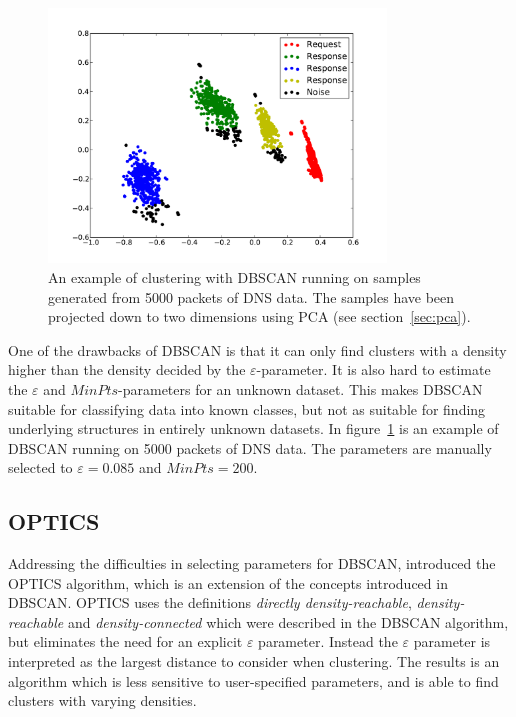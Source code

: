 \documentclass[a4paper]{report}
\begin{document}
\begin{figure}[h]
    \centering
    \includegraphics[width=0.8\textwidth]{img/dbscan_dns}
    \captionsetup{width=0.8\textwidth}
    \caption{An example of clustering with DBSCAN running on samples generated
    from 5000 packets of DNS data. The samples have been projected down to two
    dimensions using PCA (see section~\ref{sec:pca}).}
    \label{fig:dbscan}
\end{figure}

One of the drawbacks of DBSCAN is that it can only find clusters with a density
higher than the density decided by the $\varepsilon$-parameter. It is also hard
to estimate the $\varepsilon$ and $MinPts$-parameters for an unknown dataset.
This makes DBSCAN suitable for classifying data into known classes, but not as
suitable for finding underlying structures in entirely unknown datasets. In
figure~\ref{fig:dbscan} is an example of DBSCAN running on 5000 packets of DNS
data. The parameters are manually selected to $\varepsilon = 0.085$ and
$MinPts = 200$.

\subsection{OPTICS}
Addressing the difficulties in selecting parameters for DBSCAN,
\citet{ankerst99} introduced the OPTICS algorithm, which is an extension of
the concepts introduced in DBSCAN. OPTICS uses the definitions
\emph{directly density-reachable}, \emph{density-reachable} and
\emph{density-connected} which were described in the DBSCAN algorithm, but
eliminates the need for an explicit $\varepsilon$ parameter. Instead the
$\varepsilon$ parameter is interpreted as the largest distance to consider
when clustering. The results is an algorithm which is less sensitive to
user-specified parameters, and is able to find clusters with varying densities.
\end{document}
